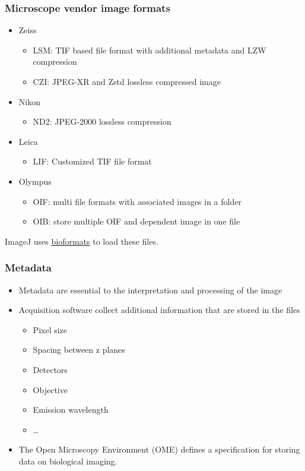 \documentclass[ignorenonframetext,aspectratio=169,10pt,xcolor=table]{beamer}
\begin{document}
\begin{frame} \frametitle{Microscope vendor image formats}

  \begin{itemize}
    \item Zeiss
      \begin{itemize} \setlength\itemsep{1em}
      \item LSM: TIF based file format with additional metadata and LZW
        compression
      \item CZI: JPEG-XR and Zstd lossless compressed image
      \end{itemize}
    \item Nikon
      \begin{itemize}
        \item ND2: JPEG-2000 lossless compression
      \end{itemize}
    \item Leica
      \begin{itemize}
        \item LIF: Customized TIF file format
      \end{itemize}
    \item Olympus
      \begin{itemize}
        \item OIF: multi file formats with associated images in a folder
        \item OIB: store multiple OIF and dependent image in one file
      \end{itemize}
  \end{itemize}

  ImageJ uses \href{https://imagej.net/formats/bio-formats}{bioformats} to load these files.

\end{frame}


\begin{frame} \frametitle{Metadata}

  \begin {itemize} \setlength\itemsep{1em}
    \item Metadata are essential to the interpretation and processing of
      the image
    \item Acquisition software collect additional information that are
      stored in the files
    \begin{itemize}
      \item Pixel size
      \item Spacing between z planes
      \item Detectors
      \item Objective
      \item Emission wavelength
      \item \dots
     \end{itemize}
    \item The Open Microscopy Environment (OME) defines a specification
    for storing data on biological imaging.
  \end{itemize}


\end{frame}
\end{document}
